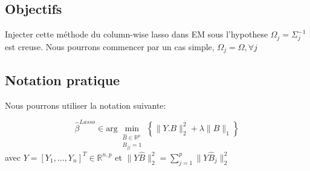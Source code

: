 \documentclass[12pt]{article}
\let\bb\mathbb       %
\def\RR{{\bb R}}\def\ZZ{{\bb Z}}\def\FF{{\bb F}}\def\DD{{\bb D}}
\def\bb{\mathbb}
\def\hat{\widehat}
\begin{document}
\subsection{Objectifs}

Injecter cette méthode du column-wise lasso dans EM sous l'hypothese $\Omega_j=\Sigma_j^{-1}$ est creuse. Nous pourrons commencer par un cas simple, $\Omega_j=\Omega,\forall j$

\subsection{Notation pratique}

Nous pourrons utiliser la notation suivante:

 $$
\hat\beta^{Lasso} \in \text{arg}\min_{\substack{\hat B\in\RR^{p}\\B_{jj}=1}}
\left\{\parallel Y.B \parallel_2^2+\lambda \parallel B \parallel_1 \right\}
$$
avec $Y=[Y_1,...,Y_n]^T\in\RR^{n,p}$ et $\parallel Y\hat B\parallel_2^2=\sum_{j=1}^p\parallel Y\hat B_j\parallel_2^2$
\end{document}
